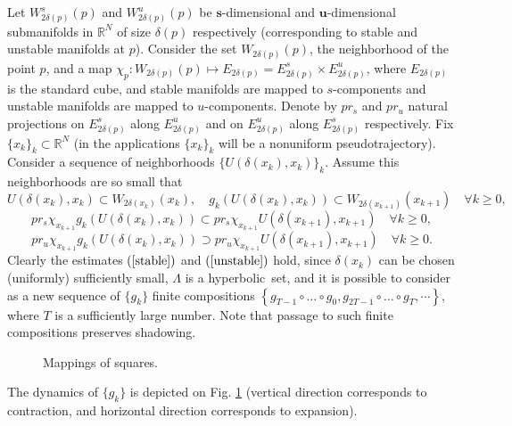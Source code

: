 \documentclass[11pt]{article}
\theoremstyle{Mystyle}
\begin{document}
Let $W_{2\delta(p)}^{s}(p)$ and $W_{2\delta(p)}^u(p)$ be $\textbf{s}$-dimensional and $\textbf{u}$-dimensional submanifolds in $\mathbb{R}^{N}$ of size $\delta(p)$ respectively (corresponding to stable and unstable manifolds at $p$).  
Consider the set $W_{2\delta(p)}(p)$, the neighborhood of the point $p$, and a map $\chi_{p}: W_{2\delta(p)}(p)\mapsto E_{2\delta(p)}=E_{2\delta(p)}^s\times E_{2\delta(p)}^u$, where $E_{2\delta(p)}$ is the standard cube, and stable manifolds are mapped to $s$-components and unstable manifolds are mapped to $u$-components.
Denote by $pr_s$ and $pr_u$ natural projections on $E_{2\delta(p)}^s$ along $E_{2\delta(p)}^{u}$ and on $E_{2\delta(p)}^{u}$ along $E_{2\delta(p)}^{s}$ respectively.
Fix $\{x_k\}_k\subset \mathbb{R}^N$ (in the applications $\{x_k\}_k$ will be a nonuniform pseudotrajectory).
Consider a sequence of neighborhoods $\{U(\delta(x_k),x_k)\}_{k}$.
Assume this neighborhoods are so small that 
\begin{equation}
\label{Udef}
U(\delta(x_k),x_{k})\subset W_{2\delta(x_{k})}(x_{k}),\quad
g_k(U(\delta(x_k),x_k))\subset W_{2\delta(x_{k+1})}(x_{k+1})\quad\forall k\geq0,
\end{equation} 
\begin{equation}
\label{stable}
pr_{s}\chi_{x_{k+1}}g_k(U(\delta(x_{k}),x_k)) \subset pr_s \chi_{x_{k+1}}U(\delta(x_{k+1}),x_{k+1})\quad\forall k\geq0,
\end{equation}
\begin{equation}
\label{unstable}
pr_{u}\chi_{x_{k+1}}g_k(U(\delta(x_k),x_{k})) \supset pr_u \chi_{x_{k+1}}U(\delta(x_{k+1}),x_{k+1})\quad\forall k\geq0.
\end{equation}
Clearly the estimates $(\ref{stable})$ and $(\ref{unstable})$ hold, since $\delta(x_k)$ can be chosen (uniformly) sufficiently small, $\Lambda$ is a hyperbolic~set, and it is possible to consider as a new sequence of $\{g_k\}$ finite compositions $\left\{g_{T-1}\circ\ldots\circ g_0, g_{2T-1}\circ\ldots\circ g_{T},\cdots\right\}$, where $T$ is a sufficiently large number. Note that passage to such finite compositions preserves shadowing. 

\begin{figure}[h]
	\centering
\def\svgwidth{\columnwidth}

\caption{Mappings of squares.}
\label{Fig3}
\end{figure}


The dynamics of $\{g_k\}$ is depicted on Fig. \ref{Fig3} (vertical direction corresponds to contraction, and horizontal direction corresponds to expansion). 
\end{document}
